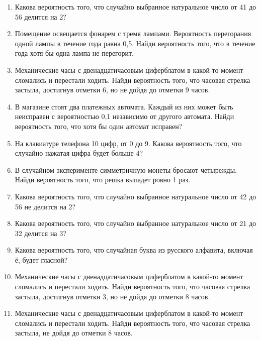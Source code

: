 \documentclass[12pt]{article} %
\begin{document}
\begin{enumerate}
\begin{enumerate}
\item	Какова вероятность того, что случайно выбранное натуральное число от 41 до 56 делится на 2?

\newpage
\item	Помещение освещается фонарем с тремя лампами. Вероятность перегорания одной лампы в течение года равна 0,5. Найди вероятность того, что в течение года хотя бы одна лампа не перегорит.

\item	Механические часы с двенадцатичасовым циферблатом в какой-то момент сломались и перестали ходить. Найди вероятность того, что часовая стрелка застыла, достигнув отметки 6, но не дойдя до отметки 9 часов.

\item	В  магазине стоят два платежных автомата.  Каждый из них может быть неисправен с вероятностью 0,1 независимо от другого автомата. Найди вероятность того, что хотя бы один автомат исправен?

\item	На клавиатуре телефона 10 цифр, от 0 до 9. Какова вероятность того, что случайно нажатая цифра будет больше 4?

\item	В случайном эксперименте симметричную монеты бросают четырежды. Найди вероятность того, что решка выпадет ровно 1 раз.


\item	Какова вероятность того, что случайно выбранное натуральное число от 42 до 56  не делится на 2?

\item	Какова вероятность того, что случайно выбранное натуральное число от 21 до 32  делится на 3?

\item	Какова вероятность того, что случайная буква из русского алфавита, включая ё, будет гласной?



\item	Механические часы с двенадцатичасовым циферблатом в какой-то момент сломались и перестали ходить. Найди вероятность того, что часовая стрелка застыла, достигнув отметки 3, но не дойдя до отметки 8 часов.


\item	Механические часы с двенадцатичасовым циферблатом в какой-то момент сломались и перестали ходить. Найди вероятность того, что часовая стрелка застыла, не дойдя до отметки 8 часов.




\end{enumerate}
\end{enumerate}
\end{document}

